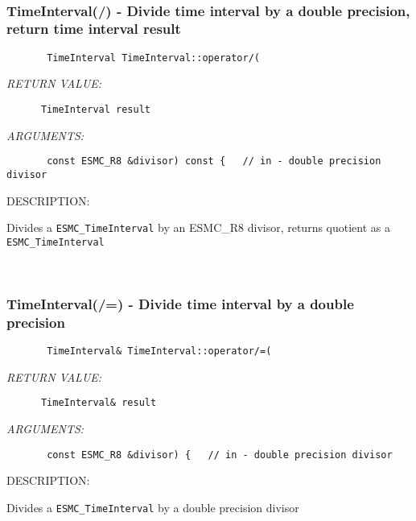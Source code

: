 \mbox{}\hrulefill\ 
 
\subsubsection [TimeInterval(/)] {TimeInterval(/) - Divide time interval by a double precision, return time interval result}


  
\begin{verbatim}       TimeInterval TimeInterval::operator/(\end{verbatim}{\em RETURN VALUE:}
\begin{verbatim}      TimeInterval result\end{verbatim}{\em ARGUMENTS:}
\begin{verbatim}       const ESMC_R8 &divisor) const {   // in - double precision divisor\end{verbatim}
{\sf DESCRIPTION:\\ }


      Divides a {\tt ESMC\_TimeInterval} by an ESMC_R8 divisor,
      returns quotient as a {\tt ESMC\_TimeInterval}
   
 
\mbox{}\hrulefill\ 
 
\subsubsection [TimeInterval(/=)] {TimeInterval(/=) - Divide time interval by a double precision}


  
\begin{verbatim}       TimeInterval& TimeInterval::operator/=(\end{verbatim}{\em RETURN VALUE:}
\begin{verbatim}      TimeInterval& result\end{verbatim}{\em ARGUMENTS:}
\begin{verbatim}       const ESMC_R8 &divisor) {   // in - double precision divisor\end{verbatim}
{\sf DESCRIPTION:\\ }


      Divides a {\tt ESMC\_TimeInterval} by a double precision divisor
   
 
\mbox{}\hrulefill\ 
 
